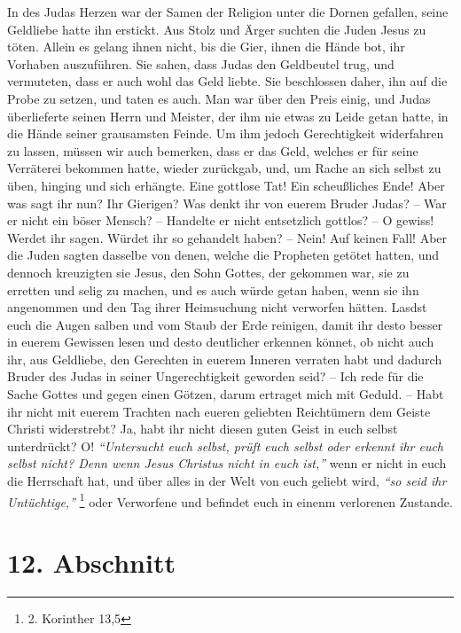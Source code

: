 In des Judas Herzen war der Samen der Religion unter die Dornen gefallen, seine
Geldliebe hatte ihn erstickt. Aus Stolz und Ärger suchten die Juden Jesus zu
töten. Allein es gelang ihnen nicht, bis die Gier, ihnen die Hände bot, ihr
Vorhaben auszuführen. Sie sahen, dass Judas den Geldbeutel trug, und vermuteten, dass
er auch wohl das Geld liebte. Sie beschlossen daher, ihn auf die Probe zu
setzen, und taten es auch. Man war über den Preis einig, und Judas
überlieferte seinen Herrn und Meister, der ihm nie etwas zu Leide getan hatte,
in die Hände seiner grausamsten Feinde. Um ihm jedoch Gerechtigkeit widerfahren
zu lassen, müssen wir auch bemerken, dass er das Geld, welches er für seine
Verräterei bekommen hatte, wieder zurückgab, und, um Rache an sich selbst zu
üben, hinging und sich erhängte. Eine gottlose
Tat! Ein scheußliches Ende! Aber
was sagt ihr nun? Ihr Gierigen? Was denkt ihr von euerem Bruder Judas? -- War er
nicht ein böser Mensch? -- Handelte er nicht entsetzlich gottlos? -- O gewiss!
Werdet ihr sagen. Würdet ihr so gehandelt haben? -- Nein! Auf keinen Fall! Aber
die Juden sagten dasselbe von denen, welche die
Propheten getötet hatten, und
dennoch kreuzigten sie Jesus, den Sohn Gottes, der gekommen war, sie zu
erretten
und selig zu machen, und es auch würde getan haben, wenn sie ihn angenommen und
den Tag ihrer Heimsuchung nicht verworfen hätten. Lasdst euch
die Augen salben und vom Staub der Erde reinigen, damit ihr desto besser in euerem Gewissen
lesen und desto deutlicher erkennen könnet, ob nicht auch ihr, aus Geldliebe,
den Gerechten in euerem Inneren verraten habt und dadurch Bruder des Judas in
seiner Ungerechtigkeit geworden seid? -- Ich rede für die Sache Gottes und gegen
einen Götzen, darum ertraget mich mit Geduld. -- Habt ihr nicht
mit euerem
Trachten nach eueren geliebten Reichtümern dem Geiste Christi widerstrebt? Ja,
habt ihr nicht diesen guten Geist in euch selbst unterdrückt? O!
\textit{"`Untersucht
euch selbst, prüft euch selbst oder erkennt ihr euch selbst nicht? Denn wenn
Jesus Christus nicht in euch ist,"'}
wenn er nicht in euch die Herrschaft hat,
und über alles in der Welt von euch geliebt wird, \textit{"`so seid ihr
Untüchtige,"'}
\footnote{2. Korinther 13,5}
oder Verworfene und befindet euch in einenm
verlorenen Zustande.

\section{12. Abschnitt} \label{kap13_ab12}

